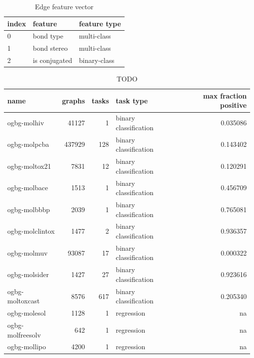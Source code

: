 \begin{table}
    \centering
    \begin{tabular}{lll}
        \toprule
        index & feature       & feature type \\\midrule
        0     & bond type     & multi-class  \\
        1     & bond stereo   & multi-class  \\
        2     & is conjugated & binary-class \\\bottomrule
    \end{tabular}
    \caption{Edge feature vector}
    \label{edge_features}
\end{table}

\begin{table}[]
    \centering
    \begin{tabular}{@{}lrrlr@{}}
        \toprule
        name             & graphs & tasks & task type             & max fraction positive \\ \midrule
        ogbg-molhiv      & 41127  & 1     & binary classification & 0.035086              \\
        ogbg-molpcba     & 437929 & 128   & binary classification & 0.143402              \\
        ogbg-moltox21    & 7831   & 12    & binary classification & 0.120291              \\
        ogbg-molbace     & 1513   & 1     & binary classification & 0.456709              \\
        ogbg-molbbbp     & 2039   & 1     & binary classification & 0.765081              \\
        ogbg-molclintox  & 1477   & 2     & binary classification & 0.936357              \\
        ogbg-molmuv      & 93087  & 17    & binary classification & 0.000322              \\
        ogbg-molsider    & 1427   & 27    & binary classification & 0.923616              \\
        ogbg-moltoxcast  & 8576   & 617   & binary classification & 0.205340              \\
        ogbg-molesol     & 1128   & 1     & regression            & na                    \\
        ogbg-molfreesolv & 642    & 1     & regression            & na                    \\
        ogbg-mollipo     & 4200   & 1     & regression            & na                    \\ \bottomrule
    \end{tabular}
    \caption{TODO}
\end{table}


